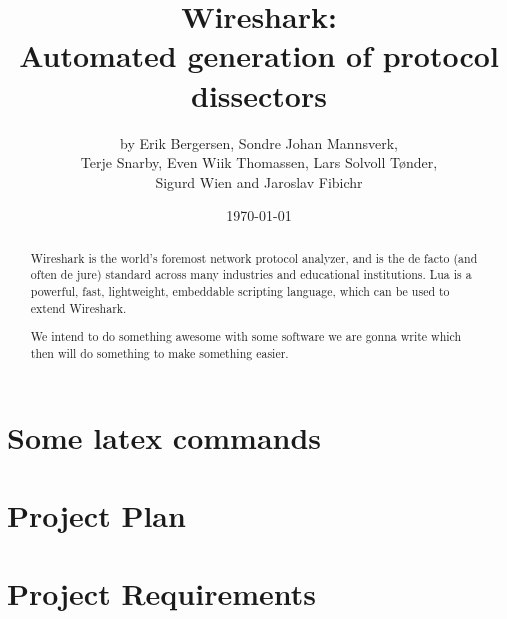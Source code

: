 \documentclass[a4paper, 11pt]{report}
\title{Wireshark:\\ Automated generation of protocol dissectors}
\author{by Erik Bergersen, Sondre Johan Mannsverk,\\ Terje Snarby,
		Even Wiik Thomassen, Lars Solvoll Tønder,\\ Sigurd Wien
		and Jaroslav Fibichr}
\date{\today}
\begin{document}
\maketitle

\begin{abstract}
Wireshark is the world's foremost network protocol analyzer, and is the de
facto (and often de jure) standard across many industries and educational
institutions. Lua is a powerful, fast, lightweight, embeddable scripting
language, which can be used to extend Wireshark.

We intend to do something awesome with some software we are gonna write
which then will do something to make something easier.
\end{abstract}

\tableofcontents

\part{Some latex commands}


\part{Project Plan}


\part{Project Requirements}

\end{document}
